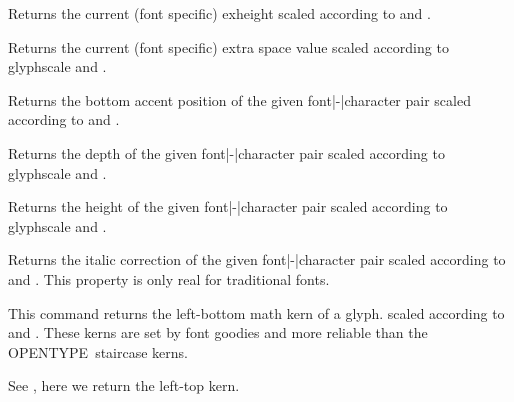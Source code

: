 \stopnewprimitive

\startnewprimitive[title={\prm {scaledexheight}}]

Returns the current (font specific) exheight scaled according to 
and .

\stopnewprimitive

\startnewprimitive[title={\prm {scaledextraspace}}]

Returns the current (font specific) extra space value scaled according to \prm
{glyphscale} and .

\stopnewprimitive

\startnewprimitive[title={\prm {scaledfontcharba}}]

Returns the bottom accent position of the given font|-|character pair scaled
according to  and .

\stopnewprimitive

\startnewprimitive[title={\prm {scaledfontchardp}}]

Returns the depth of the given font|-|character pair scaled according to \prm
{glyphscale} and .

\stopnewprimitive

\startnewprimitive[title={\prm {scaledfontcharht}}]

Returns the height of the given font|-|character pair scaled according to \prm
{glyphscale} and .

\stopnewprimitive

\startnewprimitive[title={\prm {scaledfontcharic}}]

Returns the italic correction of the given font|-|character pair scaled according
to  and . This property is only real for
traditional fonts.

\stopnewprimitive

\startnewprimitive[title={\prm {scaledfontcharlb}}]

This command returns the left-bottom math kern of a glyph. scaled according to
 and . These kerns are set by \CONTEXT font
goodies and more reliable than the OPENTYPE\ staircase kerns.

\stopnewprimitive

\startnewprimitive[title={\prm {scaledfontcharlt}}]

See , here we return the left-top kern.

\stopnewprimitive

